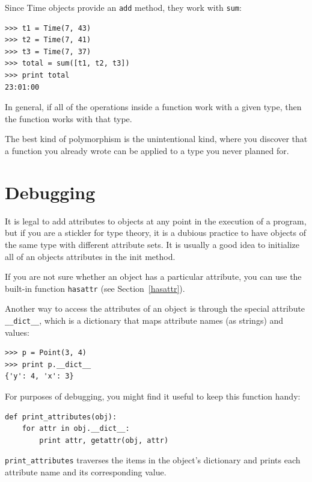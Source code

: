\documentclass[10pt]{book}
\begin{document}
{

Since Time objects provide an {\tt add} method, they work
with {\tt sum}:

\beforeverb
\begin{verbatim}
>>> t1 = Time(7, 43)
>>> t2 = Time(7, 41)
>>> t3 = Time(7, 37)
>>> total = sum([t1, t2, t3])
>>> print total
23:01:00
\end{verbatim}
\afterverb
%
In general, if all of the operations inside a function 
work with a given type, then the function works with that type.

The best kind of polymorphism is the unintentional kind, where
you discover that a function you already wrote can be
applied to a type you never planned for.


\section{Debugging}

It is legal to add attributes to objects at any point in the execution
of a program, but if you are a stickler for type theory, it is a
dubious practice to have objects of the same type with different
attribute sets.  It is usually a good idea to
initialize all of an objects attributes in the init method.


If you are not sure whether an object has a particular attribute, you
can use the built-in function {\tt hasattr} (see Section~\ref{hasattr}).


Another way to access the attributes of an object is through the
special attribute \verb"__dict__", which is a dictionary that maps
attribute names (as strings) and values:

\beforeverb
\begin{verbatim}
>>> p = Point(3, 4)
>>> print p.__dict__
{'y': 4, 'x': 3}
\end{verbatim}
\afterverb
%
For purposes of debugging, you might find it useful to keep this
function handy:

\beforeverb
\begin{verbatim}
def print_attributes(obj):
    for attr in obj.__dict__:
        print attr, getattr(obj, attr)
\end{verbatim}
\afterverb
%
\verb"print_attributes" traverses the items in the object's dictionary
and prints each attribute name and its corresponding value.

}
\end{document}
